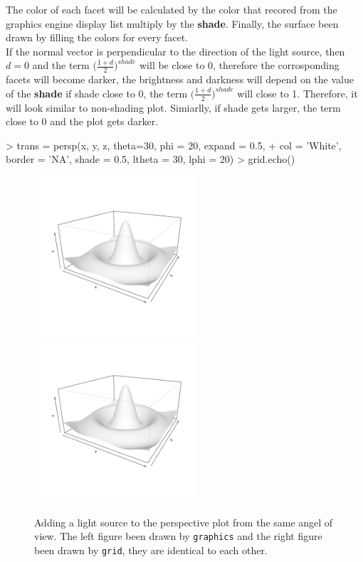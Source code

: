 \documentclass[paper=a4, fontsize=11pt]{report}
\begin{document}
The color of each facet will be calculated by the color that recored from the graphics engine display list multiply by the \textbf{shade}. Finally, the surface been drawn by filling the colors for every facet.\\

If the normal vector is perpendicular to the direction of the light source, then $d = 0$ and the term $\big(\frac{1 + d}{2}\big)^{shade}$ will be close to 0, therefore the corrosponding facets will become darker, the brightness and darkness will depend on the value of the \textbf{shade} if shade close to 0, the term $\big(\frac{1 + d}{2}\big)^{shade}$ will close to 1. Therefore, it will look similar to non-shading plot. Simiarlly, if shade gets larger, the term close to 0 and the plot gets darker.

\begin{Schunk}
\begin{Sinput}
> trans = persp(x, y, z, theta=30, phi = 20, expand = 0.5,
+  col = 'White', border = 'NA', shade = 0.5, ltheta = 30, lphi = 20)
> grid.echo()
\end{Sinput}
\end{Schunk}


\begin{figure}[h]
\begin{center}
  \includegraphics[height = 6cm, width = 6cm]{figure/Lighting_1.pdf}
  \includegraphics[height = 6cm, width = 6cm]{figure/Lighting_2.pdf}
  \caption{Adding a light source to the perspective plot from the same angel of view. The left figure been drawn by \texttt{graphics} and the right figure been drawn by \texttt{grid}, they are identical to each other.}
  	\label{figure7}
\end{center}
\end{figure}
\end{document}
